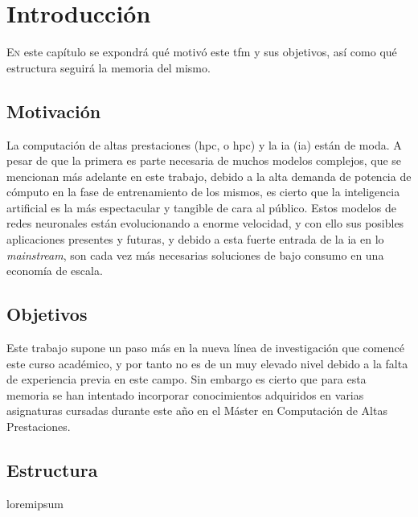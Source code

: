 \chapter{Introducción}
\label{chap:introducion}

\lettrine{E}{n} este capítulo se expondrá qué motivó este \acrlong{tfm} y sus objetivos, así como qué estructura seguirá la memoria del mismo.

\section{Motivación}
\label{sec:motivacion}
La computación de altas prestaciones (\acrshort{hpc}, o \acrlong{hpc}) y la \acrlong{ia} (\acrshort{ia}) están de moda. A pesar de que la primera es parte necesaria de muchos modelos complejos, que se mencionan más adelante en este trabajo, debido a la alta demanda de potencia de cómputo en la fase de entrenamiento de los mismos, es cierto que la inteligencia artificial es la más espectacular y tangible de cara al público.
Estos modelos de redes neuronales están evolucionando a enorme velocidad, y con ello sus posibles aplicaciones presentes y futuras, y debido a esta fuerte entrada de la \acrshort{ia} en lo \textit{mainstream}, son cada vez más necesarias soluciones de bajo consumo en una economía de escala.

\section{Objetivos}
\label{sec:objetivos}
Este trabajo supone un paso más en la nueva línea de investigación que comencé este curso académico, y por tanto no es de un muy elevado nivel debido a la falta de experiencia previa en este campo. Sin embargo es cierto que para esta memoria se han intentado incorporar conocimientos adquiridos en varias asignaturas cursadas durante este año en el Máster en Computación de Altas Prestaciones.



\section{Estructura}
\label{sec:estructura}
loremipsum